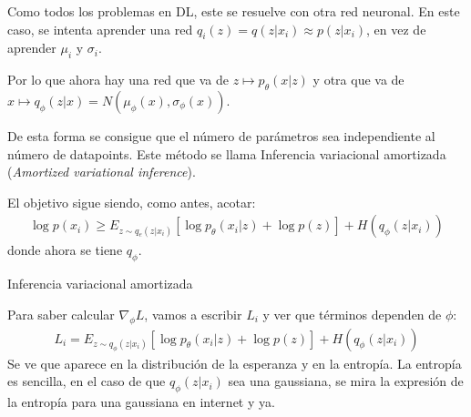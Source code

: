 Como todos los problemas en DL, este se resuelve con otra red neuronal. En este caso, se intenta
aprender una red $q_i(z)=q(z|x_i)\approx p(z|x_i)$, en vez de aprender $\mu_i$ y $\sigma_i$. 

Por lo que ahora hay una red que va de $z \mapsto p_\theta(x|z)$ y otra que va de $x\mapsto
q_\phi(z|x) = N(\mu_\phi(x),\sigma_\phi(x))$.

De esta forma se consigue que el número de parámetros sea independiente al número de
datapoints.  Este método se llama Inferencia variacional amortizada (\textit{Amortized variational
inference}).

El objetivo sigue siendo, como antes, acotar:
\begin{align}
\operatorname { log } p ( x _ { i } ) \geq E _ { z \sim q _ { e } ( z | x _ { i } ) } [ \operatorname { log } p _ { \theta } ( x _ { i } | z ) + \operatorname { log } p ( z ) ] + H ( q _ { \phi } ( z | x _ { i } ) )
\end{align}
donde ahora se tiene $q_\phi$. 

\begin{algorithm}
    \caption{Inferencia variacional amortizada}
\end{algorithm}

Para saber calcular $\nabla_\phi L$, vamos a escribir $L_i$ y ver que términos dependen de
$\phi$:
\begin{align}
L _ { i } = E _ { z \sim q _ { \phi } ( z | x _ { i } ) } [ \operatorname { log } p _ { \theta } ( x _ { i } | z ) + \operatorname { log } p ( z ) ] + H ( q _ { \phi } ( z | x _ { i } ) )
\end{align}
Se ve que aparece en la distribución de la esperanza y en la entropía. La entropía es
sencilla, en el caso de que $q_\phi(z|x_i)$ sea una gaussiana, se mira la expresión de la
entropía para una gaussiana en internet y ya.

